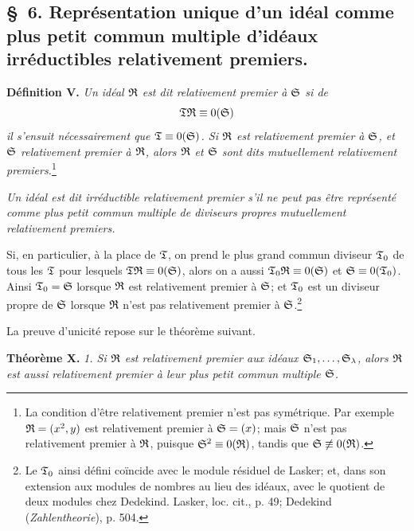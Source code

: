 \subsection*{\S~6. Représentation unique d'un idéal comme plus petit commun multiple d'idéaux irréductibles relativement premiers.}

\textbf{Définition V.} \emph{Un idéal $\mathfrak{R}$ est dit relativement premier à $\mathfrak{S}$ si de
\[
 \mathfrak{T}\mathfrak{R}\equiv0(\mathfrak{S})
\]
il s'ensuit nécessairement que $\mathfrak{T}\equiv0(\mathfrak{S})$. Si $\mathfrak{R}$ est relativement premier à $\mathfrak{S}$, et $\mathfrak{S}$ relativement premier à $\mathfrak{R}$, alors $\mathfrak{R}$ et $\mathfrak{S}$ sont dits mutuellement relativement premiers.}\footnote{La condition d'être relativement premier n'est pas symétrique. Par exemple $\mathfrak{R}=(x^2,y)$ est relativement premier à $\mathfrak{S}=(x)$; mais $\mathfrak{S}$ n'est pas relativement premier à $\mathfrak{R}$, puisque $\mathfrak{S}^2\equiv0(\mathfrak{R})$, tandis que $\mathfrak{S}\not\equiv0(\mathfrak{R})$.}

\emph{Un idéal est dit irréductible relativement premier s'il ne peut pas être représenté comme plus petit commun multiple de diviseurs propres mutuellement relativement premiers.}

Si, en particulier, à la place de $\mathfrak{T}$, on prend le plus grand commun diviseur $\mathfrak{T}_0$ de tous les $\mathfrak{T}$ pour lesquels $\mathfrak{T}\mathfrak{R}\equiv0(\mathfrak{S})$, alors on a aussi $\mathfrak{T}_0\mathfrak{R}\equiv0(\mathfrak{S})$ et $\mathfrak{S}\equiv0(\mathfrak{T}_0)$. Ainsi $\mathfrak{T}_0=\mathfrak{S}$ lorsque $\mathfrak{R}$ est relativement premier à $\mathfrak{S}$; et $\mathfrak{T}_0$ est un diviseur propre de $\mathfrak{S}$ lorsque $\mathfrak{R}$ n'est pas relativement premier à $\mathfrak{S}$.\footnote{Le $\mathfrak{T}_0$ ainsi défini coïncide avec le \og{} module résiduel \fg{} de Lasker; et, dans son extension aux modules de nombres au lieu des idéaux, avec le \og{} quotient \fg{} de deux modules chez Dedekind. Lasker, loc. cit., p. 49; Dedekind (\emph{Zahlentheorie}), p. 504.}

La preuve d'unicité repose sur le théorème suivant.

\textbf{Théorème X.} \emph{1. Si $\mathfrak{R}$ est relativement premier aux idéaux $\mathfrak{S}_1,\ldots,\mathfrak{S}_\lambda$, alors $\mathfrak{R}$ est aussi relativement premier à leur plus petit commun multiple $\mathfrak{S}$.}

